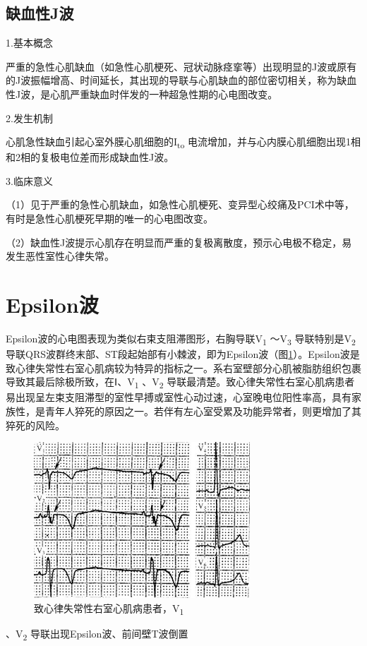 \subsection{缺血性J波}

1.基本概念

严重的急性心肌缺血（如急性心肌梗死、冠状动脉痉挛等）出现明显的J波或原有的J波振幅增高、时间延长，其出现的导联与心肌缺血的部位密切相关，称为缺血性J波，是心肌严重缺血时伴发的一种超急性期的心电图改变。

2.发生机制

心肌急性缺血引起心室外膜心肌细胞的I\textsubscript{to}
电流增加，并与心内膜心肌细胞出现1相和2相的复极电位差而形成缺血性J波。

3.临床意义

（1）见于严重的急性心肌缺血，如急性心肌梗死、变异型心绞痛及PCI术中等，有时是急性心肌梗死早期的唯一的心电图改变。

（2）缺血性J波提示心肌存在明显而严重的复极离散度，预示心电极不稳定，易发生恶性室性心律失常。

\protect\hypertarget{text00010.htmlux5cux23subid70}{}{}

\section{Epsilon波}

Epsilon波的心电图表现为类似右束支阻滞图形，右胸导联V\textsubscript{1}
～V\textsubscript{3} 导联特别是V\textsubscript{2}
导联QRS波群终末部、ST段起始部有小棘波，即为Epsilon波（图\ref{fig4-3}）。Epsilon波是致心律失常性右室心肌病较为特异的指标之一。系右室壁部分心肌被脂肪组织包裹导致其最后除极所致，在Ⅰ、V\textsubscript{1}
、V\textsubscript{2}
导联最清楚。致心律失常性右室心肌病患者易出现呈左束支阻滞型的室性早搏或室性心动过速，心室晚电位阳性率高，具有家族性，是青年人猝死的原因之一。若伴有左心室受累及功能异常者，则更增加了其猝死的风险。

\begin{figure}[!htbp]
 \centering
 \includegraphics[width=3.1875in,height=2.30208in]{./images/Image00078.jpg}
 \captionsetup{justification=centering}
 \caption{致心律失常性右室心肌病患者，V\textsubscript{1}}
 \label{fig4-3}
  \end{figure} 
、V\textsubscript{2} 导联出现Epsilon波、前间壁T波倒置

